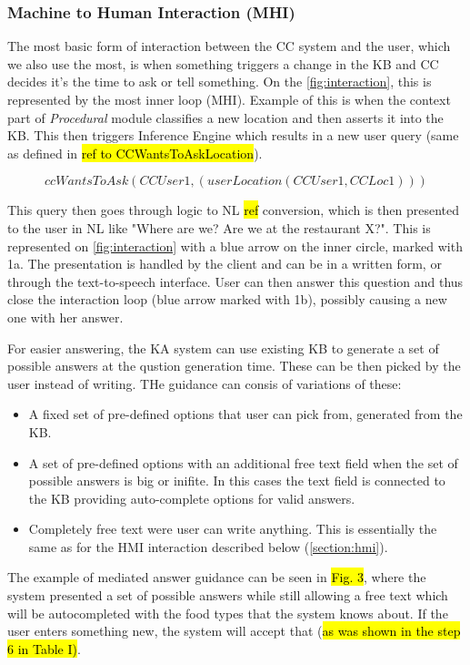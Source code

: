 \subsubsection{Machine to Human Interaction (MHI)}
\label{section:mhi}
The most basic form of interaction between the CC system and the user, which
we also use the most, is when something triggers a change in the KB and 
CC decides it's the time to ask or tell something. On the 
\autoref{fig:interaction}, this is represented by the most inner loop (MHI). 
Example of this is when the context part of \emph{Procedural} module classifies
a new location and then asserts it into the KB. This then triggers Inference 
Engine which results in a new user query (same as defined in 
\hl{ref to CCWantsToAskLocation}).

\begin{equation*}
	\label{eq:ccWantsLoc}
	ccWantsToAsk(CCUser1, (userLocation(CCUser1,CCLoc1)))
\end{equation*}

This query then goes through logic to NL \hl{ref} conversion, which is then
presented to the user in NL like "Where are we? Are we at the restaurant X?".
This is represented on \autoref{fig:interaction} with a blue arrow on the
inner circle, marked with 1a. The presentation is handled by the client and 
can be in a written form, or through the text-to-speech interface. User can then 
answer this question and thus close the interaction loop (blue arrow marked with
1b), possibly causing a new one with her answer. 

For easier answering, the KA system can use existing KB to generate a set of 
possible answers at the qustion generation time. These can be then picked by
the user instead of writing. THe guidance can consis of variations of these:
\begin{itemize}
	\item A fixed set of pre-defined options that user can pick from, generated
	from the KB.
	\item A set of pre-defined options with an additional free text field when
	the set of possible answers is big or inifite. In this cases the text field
	is connected to the KB providing auto-complete options for valid answers.
	\item Completely free text were user can write anything. This is essentially
	the same as for the HMI interaction described below (\autoref{section:hmi}).
\end{itemize}

The example of mediated answer guidance can be seen in \hl{Fig. 3}, where the 
system presented a set of possible answers while still allowing a free text 
which will be autocompleted with the food types that the system knows about. 
If the user enters something new, the system will accept that (\hl{as was shown 
in the step 6 in Table I)}.

